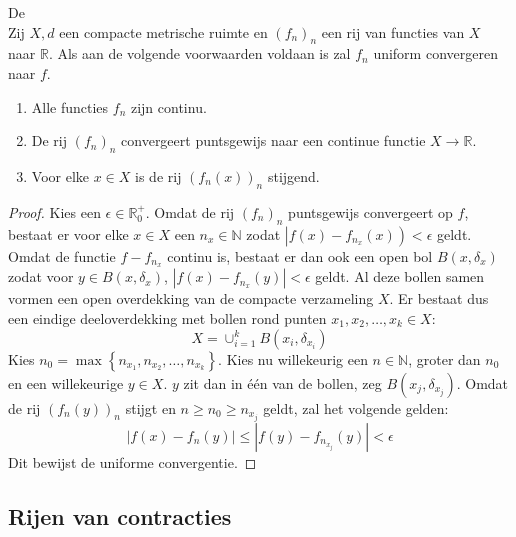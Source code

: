 \documentclass[main.tex]{subfiles}
\begin{document}
\begin{bst}
  \label{st:stelling-van-dini}
  De \\
  Zij $X,d$ een compacte metrische ruimte en $(f_{n})_{n}$ een rij van functies van $X$ naar $\mathbb{R}$.
  Als aan de volgende voorwaarden voldaan is zal $f_{n}$ uniform convergeren naar $f$.
  \begin{enumerate}
  \item Alle functies $f_{n}$ zijn continu.
  \item De rij $(f_{n})_{n}$ convergeert puntsgewijs naar een continue functie $X \rightarrow \mathbb{R}$.
  \item Voor elke $x\in X$ is de rij $(f_{n}(x))_{n}$ stijgend.
  \end{enumerate}

  \begin{proof}
    Kies een $\epsilon \in \mathbb{R}_{0}^{+}$.
    Omdat de rij $(f_{n})_{n}$ puntsgewijs convergeert op $f$, bestaat er voor elke $x\in X$ een $n_{x}\in \mathbb{N}$ zodat $\left|f(x)-f_{n_{x}}(x)\right) < \epsilon$ geldt.
    Omdat de functie $f-f_{n_{x}}$ continu is, bestaat er dan ook een open bol $B(x,\delta_{x})$ zodat voor $y\in B(x,\delta_{x})$, $\left|f(x)-f_{n_{x}}(y)\right| < \epsilon$ geldt.
    Al deze bollen samen vormen een open overdekking van de compacte verzameling $X$.
    Er bestaat dus een eindige deeloverdekking met bollen rond punten $x_{1},x_{2},\dotsc,x_{k}\in X$:
    \[ X = \cup_{i=1}^{k}B\left(x_{i},\delta_{x_{i}}\right) \]
    Kies $n_{0} = \max\left\{n_{x_{1}},n_{x_{2}},\dotsc,n_{x_{k}}\right\}$.
    Kies nu willekeurig een $n\in \mathbb{N}$, groter dan $n_{0}$ en een willekeurige $y\in X$.
    $y$ zit dan in \'e\'en van de bollen, zeg $B\left(x_{j},\delta_{x_{j}}\right)$.
    Omdat de rij $\left(f_{n}(y)\right)_{n}$ stijgt en $n \ge n_{0} \ge n_{x_{j}}$ geldt, zal het volgende gelden:
    \[ \left|f(x)-f_{n}(y)\right| \le \left| f(y) - f_{n_{x_{j}}}(y) \right| < \epsilon \]
    Dit bewijst de uniforme convergentie.
  \end{proof}
\end{bst}


\subsection{Rijen van contracties}
\label{sec:rijen-van-contr}
\end{document}
